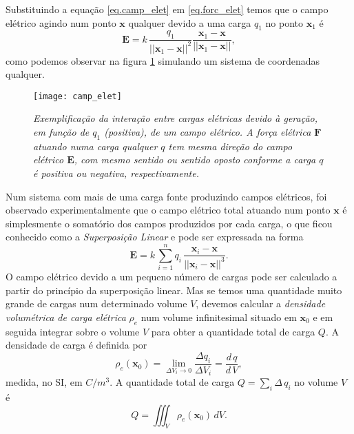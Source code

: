 Substituindo a equação \ref{eq.camp_elet} em \ref{eq.forc_elet} temos que o campo elétrico agindo num ponto $\textbf{x}$ qualquer devido a uma carga $q_1$ no ponto $\textbf{x}_1$ é
\begin{equation}\label{eq.campo_eletrico}
\textbf{E}=k\,\frac{q_1}{||\textbf{x}_1-\textbf{x}||^2}\frac{\textbf{x}_1-\textbf{x}}{||\textbf{x}_1-\textbf{x}||},
\end{equation}
como podemos observar na figura \ref{fig.camp_eletr} simulando um sistema de coordenadas qualquer.
\begin{figure}[!htb]
\centering
\texttt{[image: camp\_elet]}
\caption{\textit{Exemplificação da interação entre cargas elétricas devido à geração, em função de $q_1$ (positiva), de um campo elétrico. A força elétrica $\textbf{F}$ atuando numa carga qualquer $q$ tem mesma direção do campo elétrico $\textbf{E}$, com mesmo sentido ou sentido oposto conforme a carga $q$ é positiva ou negativa, respectivamente.}}
\label{fig.camp_eletr}
\end{figure}


Num sistema com mais de uma carga fonte produzindo campos elétricos, foi observado experimentalmente que o campo elétrico total atuando num ponto $\textbf{x}$ é simplesmente o somatório dos campos produzidos por cada carga, o que ficou conhecido como a \textit{Superposição Linear} e pode ser expressada na forma
\begin{equation*}
\textbf{E}=k\,\sum_{i=1}^{n}q_i\,\frac{\textbf{x}_i-\textbf{x}}{||\textbf{x}_i-\textbf{x}||^3}.
\end{equation*} 
O campo elétrico devido a um pequeno número de cargas pode ser calculado a partir do princípio da superposição linear. Mas se temos uma quantidade muito grande de cargas num determinado volume $V$, devemos calcular a \textit{densidade volumétrica de carga elétrica} $\rho_e$ num volume infinitesimal situado em $\textbf{x}_0$ e em seguida integrar sobre o volume $V$ para obter a quantidade total de carga $Q$. A densidade de carga é definida por
\begin{equation*}
\rho_e(\textbf{x}_0)=\lim_{\Delta V_i \to 0}\frac{\Delta q_i}{\Delta V_i}=\frac{d\,q}{d\,V},
\end{equation*}
medida, no SI, em $C/m^3$. A quantidade total de carga $Q=\sum_i \Delta\,q_i$ no volume $V$ é
\begin{equation}\label{eq.densidade_carga}
Q=\iiint_{V}\rho_e(\textbf{x}_0)\,dV.
\end{equation}

